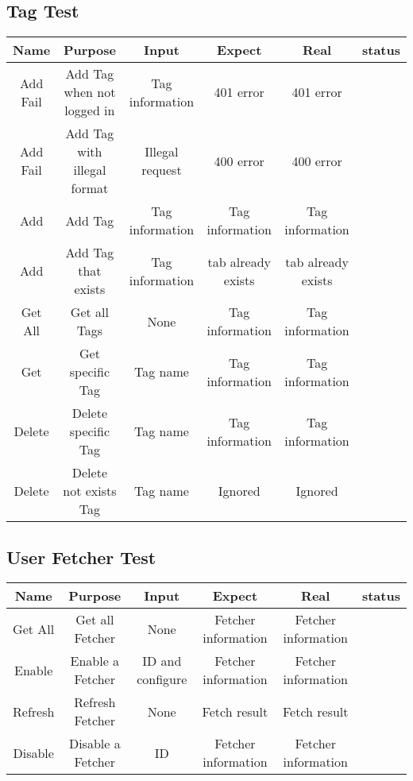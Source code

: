 \begin{landscape}
  \subsection{Tag Test}
  \begin{center}
    \begin{tabular}{c|c|c|c|c|c}
      \hline
      Name     & Purpose                     & Input           & Expect             & Real               & status \\ \hline
      Add Fail & Add Tag when not logged in  & Tag information & 401 error          & 401 error          &        \\ \hline
      Add Fail & Add Tag with illegal format & Illegal request & 400 error          & 400 error          &        \\ \hline
      Add      & Add Tag                     & Tag information & Tag information    & Tag information    &        \\ \hline
      Add      & Add Tag that exists         & Tag information & tab already exists & tab already exists &        \\ \hline
      Get All  & Get all Tags                & None            & Tag information    & Tag information    &        \\ \hline
      Get      & Get specific Tag            & Tag name        & Tag information    & Tag information    &        \\ \hline
      Delete   & Delete specific Tag         & Tag name        & Tag information    & Tag information    &        \\ \hline
      Delete   & Delete not exists Tag       & Tag name        & Ignored            & Ignored            &        \\ \hline
    \end{tabular}
  \end{center}
  \subsection{User Fetcher Test}
  \begin{center}
    \begin{tabular}{c|c|c|c|c|c}
      \hline
      Name    & Purpose           & Input            & Expect              & Real                & status \\ \hline
      Get All & Get all Fetcher   & None             & Fetcher information & Fetcher information &        \\ \hline
      Enable  & Enable a Fetcher  & ID and configure & Fetcher information & Fetcher information &        \\ \hline
      Refresh & Refresh Fetcher   & None             & Fetch result        & Fetch result        &        \\ \hline
      Disable & Disable a Fetcher & ID               & Fetcher information & Fetcher information &        \\ \hline
    \end{tabular}
  \end{center}

\end{landscape}

